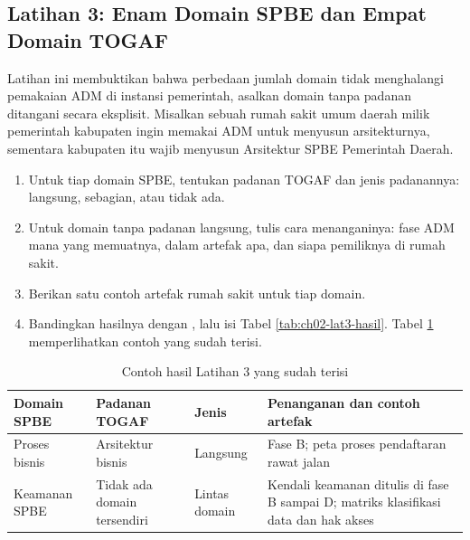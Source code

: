 \subsection*{Latihan 3: Enam Domain SPBE dan Empat Domain TOGAF}

Latihan ini membuktikan bahwa perbedaan jumlah domain tidak menghalangi
pemakaian ADM di instansi pemerintah, asalkan domain tanpa padanan ditangani
secara eksplisit. Misalkan sebuah rumah sakit umum daerah milik pemerintah
kabupaten ingin memakai ADM untuk menyusun arsitekturnya, sementara
kabupaten itu wajib menyusun Arsitektur SPBE Pemerintah Daerah.

\begin{enumerate}
  \item Untuk tiap domain SPBE, tentukan padanan TOGAF dan jenis padanannya:
        langsung, sebagian, atau tidak ada.
  \item Untuk domain tanpa padanan langsung, tulis cara menanganinya: fase ADM
        mana yang memuatnya, dalam artefak apa, dan siapa pemiliknya di rumah
        sakit.
  \item Berikan satu contoh artefak rumah sakit untuk tiap domain.
  \item Bandingkan hasilnya dengan
        , lalu isi
        Tabel \ref{tab:ch02-lat3-hasil}. Tabel \ref{tab:ch02-lat3-contoh}
        memperlihatkan contoh yang sudah terisi.
\end{enumerate}

\begin{table}[!htb]
  \centering
  \caption{Contoh hasil Latihan 3 yang sudah terisi}
  \label{tab:ch02-lat3-contoh}
  {\footnotesize
  \begin{tabularx}{\textwidth}{>{\raggedright\arraybackslash}p{2.3cm}
                               >{\raggedright\arraybackslash}p{2.8cm}
                               >{\raggedright\arraybackslash}p{1.7cm}
                               >{\raggedright\arraybackslash}X}
    \hline
    \textbf{Domain SPBE} & \textbf{Padanan TOGAF} & \textbf{Jenis} & \textbf{Penanganan dan contoh artefak} \\
    \hline
    Proses bisnis & Arsitektur bisnis & Langsung & Fase B; peta proses pendaftaran rawat jalan \\
    \hline
    Keamanan SPBE & Tidak ada domain tersendiri & Lintas domain & Kendali keamanan ditulis di fase B sampai D; matriks klasifikasi data dan hak akses \\
    \hline
  \end{tabularx}}
\end{table}

